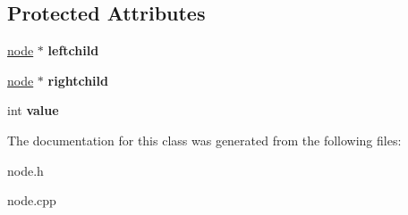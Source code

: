 \subsection*{\-Protected \-Attributes}
\begin{DoxyCompactItemize}
\item 
\hypertarget{classnode_aaa5f8b874f14d3e1e14e45ec5fc4bb70}{\hyperlink{classnode}{node} $\ast$ {\bfseries leftchild}}\label{classnode_aaa5f8b874f14d3e1e14e45ec5fc4bb70}

\item 
\hypertarget{classnode_ad9aba30b10e627250ddcda678aec29df}{\hyperlink{classnode}{node} $\ast$ {\bfseries rightchild}}\label{classnode_ad9aba30b10e627250ddcda678aec29df}

\item 
\hypertarget{classnode_a1df258d4663fc36cfd0d5d93588aa21f}{int {\bfseries value}}\label{classnode_a1df258d4663fc36cfd0d5d93588aa21f}

\end{DoxyCompactItemize}


\-The documentation for this class was generated from the following files\-:\begin{DoxyCompactItemize}
\item 
node.\-h\item 
node.\-cpp\end{DoxyCompactItemize}
